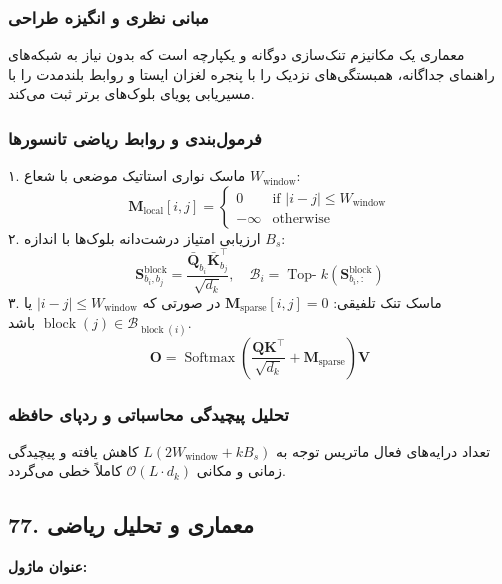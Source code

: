 \subsubsection*{مبانی نظری و انگیزه طراحی}
معماری  یک مکانیزم تنک‌سازی دوگانه و یکپارچه است که بدون نیاز به شبکه‌های راهنمای جداگانه، همبستگی‌های نزدیک را با پنجره لغزان ایستا و روابط بلندمدت را با مسیریابی پویای بلوک‌های برتر ثبت می‌کند.

\subsubsection*{فرمول‌بندی و روابط ریاضی تانسورها}
۱. ماسک نواری استاتیک موضعی با شعاع $W_{\text{window}}$:
\begin{equation}
\mathbf{M}_{\text{local}}[i, j] = \begin{cases} 0 & \text{if } |i - j| \le W_{\text{window}} \\ -\infty & \text{otherwise} \end{cases}
\end{equation}
۲. ارزیابی امتیاز درشت‌دانه بلوک‌ها با اندازه $B_s$:
\begin{equation}
\mathbf{S}_{b_i, b_j}^{\text{block}} = \frac{\bar{\mathbf{Q}}_{b_i} \bar{\mathbf{K}}_{b_j}^\top}{\sqrt{d_k}}, \quad \mathcal{B}_i = \operatorname{Top-}k\left(\mathbf{S}_{b_i, :}^{\text{block}}\right)
\end{equation}
۳. ماسک تنک تلفیقی: $\mathbf{M}_{\text{sparse}}[i, j] = 0$ در صورتی که $|i - j| \le W_{\text{window}}$ یا $\operatorname{block}(j) \in \mathcal{B}_{\operatorname{block}(i)}$ باشد.
\begin{equation}
\mathbf{O} = \operatorname{Softmax}\left(\frac{\mathbf{Q} \mathbf{K}^\top}{\sqrt{d_k}} + \mathbf{M}_{\text{sparse}}\right) \mathbf{V}
\end{equation}

\subsubsection*{تحلیل پیچیدگی محاسباتی و ردپای حافظه}
تعداد درایه‌های فعال ماتریس توجه به $L (2 W_{\text{window}} + k B_s)$ کاهش یافته و پیچیدگی زمانی و مکانی $\mathcal{O}(L \cdot d_k)$ کاملاً خطی می‌گردد.


\subsection*{77. معماری و تحلیل ریاضی }
\textbf{عنوان ماژول:} 

